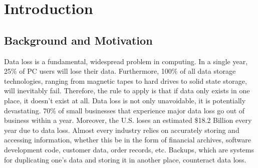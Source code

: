 \chapter{Introduction}

\section{Background and Motivation}
Data loss is a fundamental, widespread problem in computing. In a single year, 25\% of PC users will lose their data. Furthermore, 100\% of all data storage technologies, ranging from magnetic tapes to hard drives to solid state storage, will inevitably fail. \cite{imagineiti}  Therefore, the rule to apply is that if data only exists in one place, it doesn't exist at all.  Data loss is not only unavoidable, it is potentially devastating. 70\% of small businesses that experience major data loss go out of business within a year. \cite{imagineiti} Moreover, the U.S. loses an estimated \$18.2 Billion every year due to data loss. \cite{pepperdine} Almost every industry relies on accurately storing and accessing information, whether this be in the form of financial archives, software development code, customer data, order records, etc. Backups, which are systems for duplicating one’s data and storing it in another place, counteract data loss.

